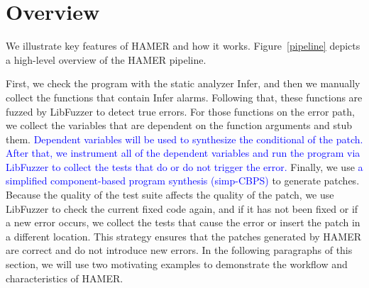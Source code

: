 \documentclass[a4j,dvipdfmx]{article}
\begin{document}
\section{Overview}

We illustrate key features of HAMER and how it works. Figure~\ref{pipeline} depicts a high-level overview of the HAMER pipeline.

First, we check the program with the static analyzer \mbox{Infer}, and then we manually collect the functions that contain Infer alarms. Following that, these functions are fuzzed by LibFuzzer to detect true errors.  For those functions on the error path, we collect the variables that are dependent on the function arguments and stub them. \textcolor{blue}{Dependent variables will be used to synthesize the conditional of the patch. After that, we instrument all of the dependent variables and run the program via LibFuzzer to collect the tests that do or do not trigger the error.} Finally, we use \textcolor{blue}{a simplified component-based program synthesis (simp-CBPS)} to generate patches. Because the quality of the test suite affects the quality of the patch, we use LibFuzzer to check the current fixed code again, and if it has not been fixed or if a new error occurs, we collect the tests that cause the error or insert the patch in a different location. This strategy ensures that the patches generated by HAMER are correct and do not introduce new errors. In the following paragraphs of this section, we will use two motivating examples to demonstrate the workflow and characteristics of HAMER.
\end{document}
